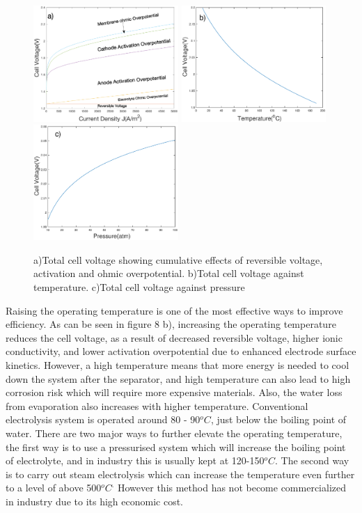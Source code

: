 \begin{figure}[h]
\includegraphics[width=5.5cm]{total.eps}
\includegraphics[width=5.5cm]{cellT.eps}
\includegraphics[width=5.5cm]{cellP.eps}
\caption{a)Total cell voltage showing cumulative effects of reversible voltage, activation and ohmic overpotential. b)Total cell voltage against temperature. c)Total cell voltage against pressure}
\end{figure}
Raising the operating temperature is one of the most effective ways to improve efficiency. As can be seen in figure 8 b), increasing the operating temperature reduces the cell voltage, as a result of decreased reversible voltage, higher ionic conductivity, and lower activation overpotential due to enhanced electrode surface kinetics. However, a high temperature means that more energy is needed to cool down the system after the separator, and high temperature can also lead to high corrosion risk which will require more expensive materials. Also, the water loss from evaporation also increases with higher temperature. Conventional electrolysis system is operated around 80 - 90$^oC$, just below the boiling point of water. There are two major ways to further elevate the operating temperature, the first way is to use a pressurised system which will increase the boiling point of electrolyte, and in industry this is usually kept at 120-150$^oC$. The second way is to carry out steam electrolysis which can increase the temperature even further to a level of above 500$^oC^.$ However this method has not become commercialized in industry due to its high economic cost.\cite{temp} \cite{reversible} \\
